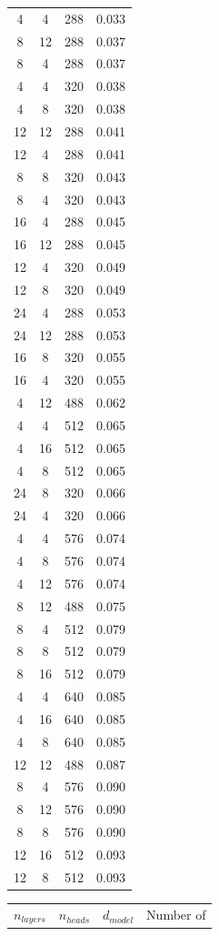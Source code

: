\documentclass[dvipsnames,11pt]{article}
\begin{document}
\begin{appendix}
\begin{table}[tp]
\begin{tabular}{cccc}
4 & 4 & 288 & 0.033\\
8 & 12 & 288 & 0.037\\
8 & 4 & 288 & 0.037\\
4 & 4 & 320 & 0.038\\
4 & 8 & 320 & 0.038\\
12 & 12 & 288 & 0.041\\
12 & 4 & 288 & 0.041\\
8 & 8 & 320 & 0.043\\
8 & 4 & 320 & 0.043\\
16 & 4 & 288 & 0.045\\
16 & 12 & 288 & 0.045\\
12 & 4 & 320 & 0.049\\
12 & 8 & 320 & 0.049\\
24 & 4 & 288 & 0.053\\
24 & 12 & 288 & 0.053\\
16 & 8 & 320 & 0.055\\
16 & 4 & 320 & 0.055\\
4 & 12 & 488 & 0.062\\
4 & 4 & 512 & 0.065\\
4 & 16 & 512 & 0.065\\
4 & 8 & 512 & 0.065\\
24 & 8 & 320 & 0.066\\
24 & 4 & 320 & 0.066\\
4 & 4 & 576 & 0.074\\
4 & 8 & 576 & 0.074\\
4 & 12 & 576 & 0.074\\
8 & 12 & 488 & 0.075\\
8 & 4 & 512 & 0.079\\
8 & 8 & 512 & 0.079\\
8 & 16 & 512 & 0.079\\
4 & 4 & 640 & 0.085\\
4 & 16 & 640 & 0.085\\
4 & 8 & 640 & 0.085\\
12 & 12 & 488 & 0.087\\
8 & 4 & 576 & 0.090\\
8 & 12 & 576 & 0.090\\
8 & 8 & 576 & 0.090\\
12 & 16 & 512 & 0.093\\
12 & 8 & 512 & 0.093\\\bottomrule
\end{tabular} 
\begin{tabular}{cccc}
\toprule
$n_{layers}$ & $n_{heads}$ & $d_{model}$ & Number of \\

\end{tabular}
\end{table}
\end{appendix}
\end{document}
